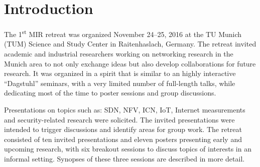 \section{Introduction}\label{sec:introduction}


The 1\textsuperscript{st} \ac{MIR} retreat was organized November 24--25, 2016 at
the TU Munich (TUM) Science and Study Center in Raitenhaslach, Germany.  The retreat
invited academic and industrial researchers working on networking research in
the Munich area to not only exchange ideas but also develop collaborations
for future research.  It was organized in a spirit that is similar to an
highly interactive ``Dagstuhl'' seminars, with a very limited number of
full-length talks, while dedicating most of the time to poster sessions and
group discussions.

Presentations on topics such as: \ac{SDN}, \ac{NFV}, \ac{ICN}, \ac{IoT},
Internet measurements and security-related research were solicited. The
invited presentations were intended to trigger discussions and identify areas
for group work. The retreat consisted of ten invited presentations and eleven
posters presenting early and upcoming research, with six breakout sessions to
discuss topics of interests in an informal setting. Synopses of these three
sessions are described in more detail.
